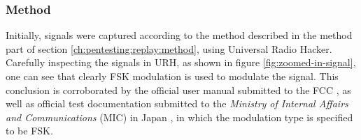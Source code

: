 \subsubsection{Method}
Initially, signals were captured according to the method described in the method part of section \ref{ch:pentesting:replay:method}, using Universal Radio Hacker. Carefully inspecting the signals in \gls{URH}, as shown in figure \ref{fig:zoomed-in-signal}, one can see that clearly \gls{FSK} modulation is used to modulate the signal. This conclusion is corroborated by the official user manual submitted to the FCC \cite{hsgw-user-manual}, as well as official test documentation submitted to the \textit{Ministry of Internal Affairs and Communications} (MIC) in Japan \cite{mic-test-report}, in which the modulation type is specified to be FSK.

